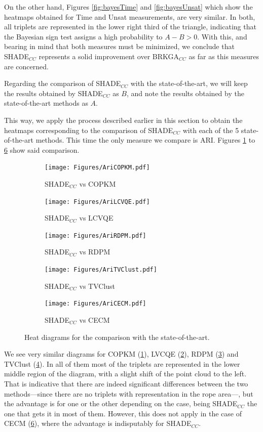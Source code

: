 \documentclass[review]{elsarticle}
\begin{document}
On the other hand, Figures \ref{fig:bayesTime} and \ref{fig:bayesUnsat} which show the heatmaps obtained for Time and Unsat measurements, are very similar. In both, all triplets are represented in the lower right third of the triangle, indicating that the Bayesian sign test assigns a high probability to $A - B > 0$. With this, and bearing in mind that both measures must be minimized, we conclude that SHADE$_{CC}$ represents a solid improvement over BRKGA$_{CC}$ as far as this measures are concerned.

Regarding the comparison of SHADE$_{CC}$ with the state-of-the-art, we will keep the results obtained by SHADE$_{CC}$ as $B$, and note the results obtained by the state-of-the-art methods as $A$.

This way, we apply the process described earlier in this section to obtain the heatmaps corresponding to the comparison of SHADE$_{CC}$ with each of the 5 state-of-the-art methods. This time the only measure we compare is ARI. Figures \ref{fig:bayesCOPKM} to \ref{fig:bayesCECM} show said comparison.

\begin{figure}[ht!]
	\centering
	\begin{subfigure}{.45\textwidth}
		\texttt{[image: Figures/AriCOPKM.pdf]}
		\caption{SHADE$_{CC}$ vs COPKM}
		\label{fig:bayesCOPKM}
	\end{subfigure}
	\begin{subfigure}{.45\textwidth}
		\texttt{[image: Figures/AriLCVQE.pdf]}
		\caption{SHADE$_{CC}$ vs LCVQE}
		\label{fig:bayesLCVQE}
	\end{subfigure}
	\begin{subfigure}{.45\textwidth}
		\texttt{[image: Figures/AriRDPM.pdf]}
		\caption{SHADE$_{CC}$ vs RDPM}
		\label{fig:bayesRDPM}
	\end{subfigure}
	\begin{subfigure}{.45\textwidth}
		\texttt{[image: Figures/AriTVClust.pdf]}
		\caption{SHADE$_{CC}$ vs TVClust}
		\label{fig:bayesTVClust}
	\end{subfigure}
	\begin{subfigure}{.45\textwidth}
		\texttt{[image: Figures/AriCECM.pdf]}
		\caption{SHADE$_{CC}$ vs CECM}
		\label{fig:bayesCECM}
	\end{subfigure}
	\caption{Heat diagrams for the comparison with the state-of-the-art.}
\end{figure}

We see very similar diagrams for COPKM (\ref{fig:bayesCOPKM}), LVCQE (\ref{fig:bayesLCVQE}), RDPM (\ref{fig:bayesRDPM}) and TVClust (\ref{fig:bayesTVClust}). In all of them most of the triplets are represented in the lower middle region of the diagram, with a slight shift of the point cloud to the left. That is indicative that there are indeed significant differences between the two methods---since there are no triplets with representation in the rope area---, but the advantage is for one or the other depending on the case, being SHADE$_{CC}$ the one that gets it in most of them. However, this does not apply in the case of CECM (\ref{fig:bayesCECM}), where the advantage is indisputably for SHADE$_{CC}$.
\end{document}

